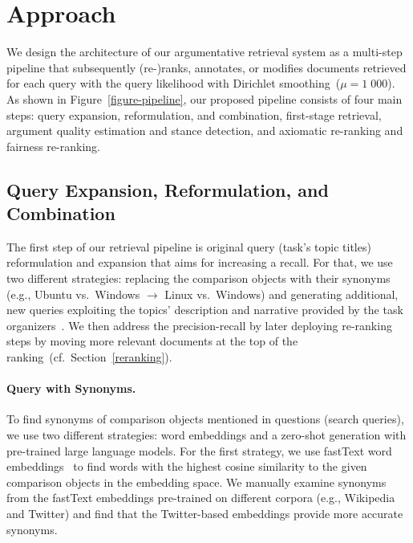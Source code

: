 \section{Approach}\label{approach}



We design the architecture of our argumentative retrieval system as a multi-step pipeline that subsequently (re-)ranks, annotates, or modifies documents retrieved for each query with the query likelihood with Dirichlet smoothing~(\(\mu = 1\;000\)). As shown in Figure~\ref{figure-pipeline}, our proposed pipeline consists of four main steps:
\Ni query expansion, reformulation, and combination,
\Nii first-stage retrieval,
\Niii argument quality estimation and stance detection,
and \Niv axiomatic re-ranking and fairness re-ranking.

\subsection{Query Expansion, Reformulation, and Combination}
\label{reformulation}

The first step of our retrieval pipeline is original query (task's topic titles) reformulation and expansion that aims for increasing a recall.
For that, we use two different strategies: \Ni replacing the comparison objects with their synonyms (e.g., Ubuntu vs.\ Windows $\rightarrow$ Linux vs.\ Windows) and \Nii generating additional, new queries exploiting the topics' description and narrative provided by the task organizers~\cite{BondarenkoFKSGBPBSWPH2022}.
We then address the precision-recall by later deploying re-ranking steps by moving more relevant documents at the top of the ranking~(cf.\ Section~\ref{reranking}).

\paragraph{Query  with Synonyms.}

To find synonyms of comparison objects mentioned in questions (search queries), we use two different strategies: \Ni word embeddings and \Nii a zero-shot generation with pre-trained large language models.
For the first strategy, we use fastText word embeddings~\cite{BojanowskiGJM2017}  to find words with the highest cosine similarity to the given comparison objects in the embedding space.
We manually examine  synonyms from the fastText embeddings pre-trained on different corpora (e.g., Wikipedia and Twitter) and find that the Twitter-based embeddings provide more accurate synonyms.

